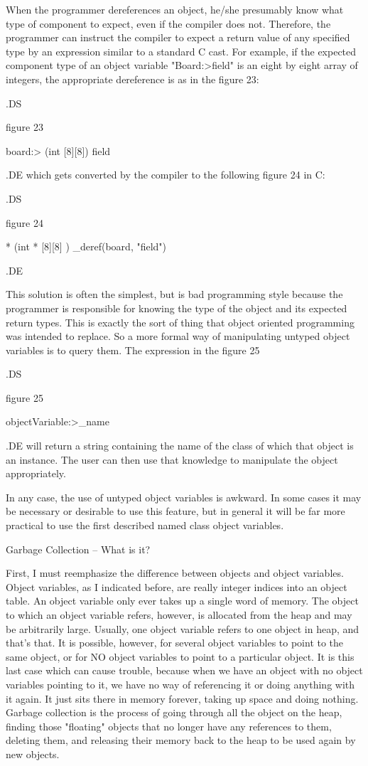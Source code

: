 When the programmer dereferences an object, he/she presumably know what type
of component to expect, even if the compiler does not.  Therefore, the
programmer can instruct the compiler to expect a return value of any
specified type by an expression similar to a standard C cast.  For example,
if the expected component type of an object variable "Board:>field"
is an eight by eight array of integers, the appropriate dereference is as in
the figure 23:

.DS

figure 23

board:> (int [8][8]) field

.DE
which gets converted by the compiler to the following figure 24 in C:

.DS

figure 24

* (int * [8][8] ) _deref(board, "field")


.DE

This solution is often the simplest, but is bad programming style because
the programmer is responsible for knowing the type of the object and its
expected return types.  This is exactly the sort of thing that object
oriented programming was intended to replace.  So a more formal way of
manipulating untyped object variables is to query them.  The expression
in the figure 25

.DS

figure 25

objectVariable:>_name


.DE
will return a string containing the name of the class of which that object
is an instance.  The user can then use that knowledge to manipulate the
object appropriately.

In any case, the use of untyped object variables is awkward.  In some cases
it may be necessary or desirable to use this feature, but in general it will
be far more practical to use the first described named class object variables.


Garbage Collection -- What is it?

First, I must reemphasize the difference between objects and object
variables.  Object variables, as I indicated before, are really integer
indices into an object table.  An object variable only ever takes up
a single word of memory.  The object to which an object variable
refers, however, is allocated from the heap and may be arbitrarily large.
Usually, one object variable refers to one object in heap, and that's that.
It is possible, however, for several object variables to point to the same
object, or for NO object variables to point to a particular object.
It is this last case which can cause trouble, because when we have an object
with no object variables pointing to it, we have no way of referencing it or
doing anything with it again.  It just sits there in memory forever, taking
up space and doing nothing.  Garbage collection is the process of going
through all the object on the heap, finding those "floating" objects that
no longer have any references to them, deleting them, and releasing
their memory back to the heap to be used again by new objects.


